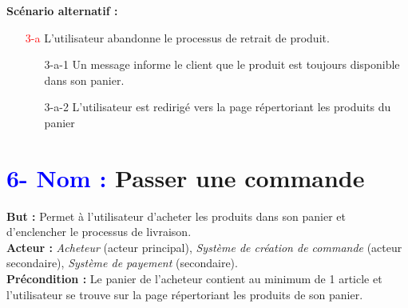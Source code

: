 \documentclass[16pt]{report}
\begin{document}
\textbf{Scénario alternatif :}
\begin{enumerate}[leftmargin=4em]
    \item[\textcolor{red}{3-a}] L’utilisateur abandonne le processus de retrait de produit.
    \begin{enumerate}[leftmargin=4em]
        \item[3-a-1] Un message informe le client que le produit est toujours disponible dans son panier.
        \item[3-a-2] L’utilisateur est redirigé vers la page répertoriant les produits du panier
    \end{enumerate}
\end{enumerate}




\section*{\textbf{\textcolor{blue}{6- Nom :}} Passer une commande}

\textbf{But :} Permet à l'utilisateur d'acheter les produits dans son panier et d'enclencher le processus de livraison. \\
\textbf{Acteur :} \textit{Acheteur} (acteur principal), \textit{Système de création de commande} (acteur secondaire), \textit{Système de payement} (secondaire). \\
\textbf{Précondition :} Le panier de l'acheteur contient au minimum de 1 article et l'utilisateur se trouve sur la page répertoriant les produits de son panier.
\end{document}
